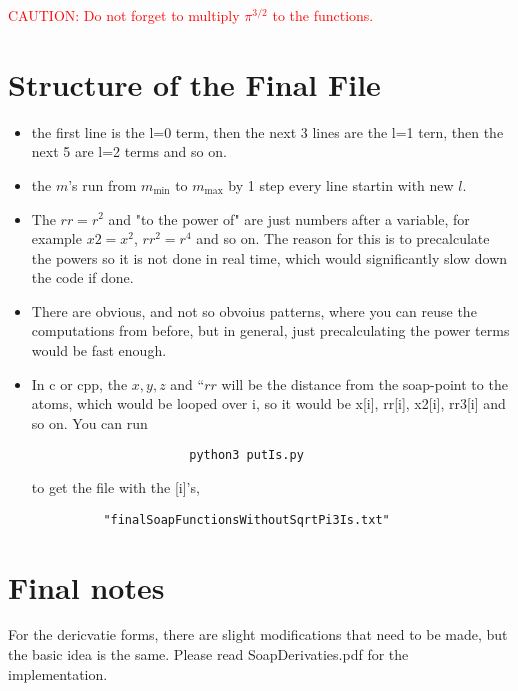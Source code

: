 \documentclass{article}
\begin{document}
\textcolor{red} {CAUTION: Do not forget to multiply $\pi^{3/2}$ to the functions.}


\newpage

\section*{Structure of the Final File}
\begin{itemize}
\item the first line is the l=0 term, then the next 3 lines are the l=1 tern, then the next 5 are l=2 terms and so on.

\item the $m$'s run from $m_\text{min}$ to $m_\text{max}$ by 1 step every line startin with new $l$.

\item The $rr=r^2$ and "to the power of" are just numbers after a variable, for example $x2 = x^2$, $rr^2 = r^4$ and so on. The reason for this is to precalculate the powers so it is not done in real time, which would significantly slow down the code if done.

\item There are obvious, and not so obvoius patterns, where you can reuse the computations from before, but in general, just precalculating the power terms would be fast enough.

\item In c or cpp, the $x,y,z$ and ``$rr$ will be the distance from the soap-point to the atoms, which would be looped over i, so it would be x[i], rr[i], x2[i], rr3[i] and so on. You can run 
\begin{verbatim}
                      python3 putIs.py 
\end{verbatim}
to get the file with the [i]'s,
\begin{verbatim}
          "finalSoapFunctionsWithoutSqrtPi3Is.txt"
\end{verbatim}
\end{itemize}

\section*{Final notes}

For the dericvatie forms, there are slight modifications that need to be made, but the basic idea is the same. Please read SoapDerivaties.pdf for the implementation.
\end{document}
